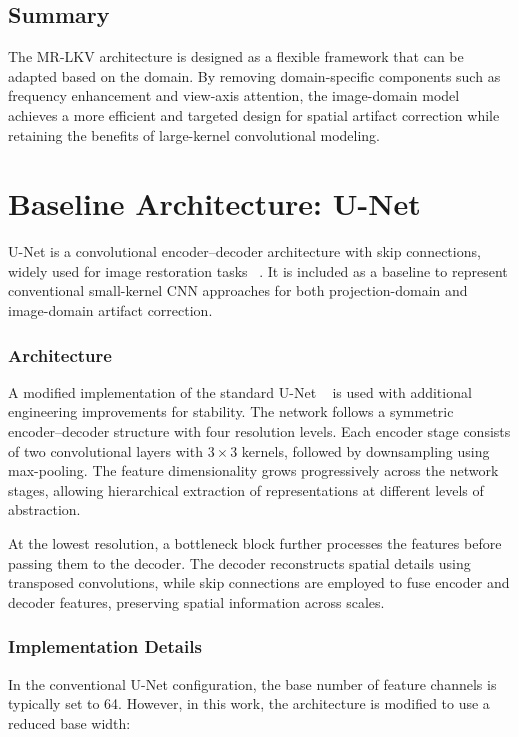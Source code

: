\subsection{Summary}

The MR-LKV architecture is designed as a flexible framework that can be adapted based on the domain. By removing domain-specific components such as frequency enhancement and view-axis attention, the image-domain model achieves a more efficient and targeted design for spatial artifact correction while retaining the benefits of large-kernel convolutional modeling. 

\section{Baseline Architecture: U-Net}

U-Net is a convolutional encoder--decoder architecture with skip connections, widely used for image restoration tasks ~\cite{ronneberger2015unet}. It is included as a baseline to represent conventional small-kernel CNN approaches for both projection-domain and image-domain artifact correction.

\subsubsection{Architecture}
A modified implementation of the standard U-Net ~\cite{ronneberger2015unet} is used with additional engineering improvements for stability.
The network follows a symmetric encoder--decoder structure with four resolution levels. Each encoder stage consists of two convolutional layers with $3 \times 3$ kernels, followed by downsampling using max-pooling. The feature dimensionality grows progressively across the network stages, allowing hierarchical extraction of representations at different levels of abstraction.


At the lowest resolution, a bottleneck block further processes the features before passing them to the decoder. The decoder reconstructs spatial details using transposed convolutions, while skip connections are employed to fuse encoder and decoder features, preserving spatial information across scales.

\subsubsection{Implementation Details}

In the conventional U-Net configuration, the base number of feature channels is typically set to 64. However, in this work, the architecture is modified to use a reduced base width:

